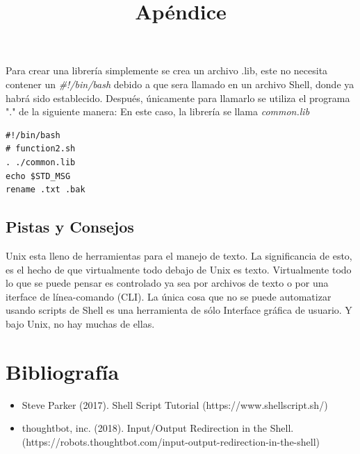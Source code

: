 \documentclass{article}
\begin{document}
Para crear una librería simplemente se crea un archivo .lib, este no necesita contener un \textit{\#!/bin/bash} debido a que sera llamado en un archivo Shell, donde ya habrá sido establecido.
Después, únicamente para llamarlo se utiliza el programa "." de la siguiente manera:
En este caso, la librería se llama \textit{common.lib}

\begin{verbatim}
#!/bin/bash
# function2.sh
. ./common.lib
echo $STD_MSG
rename .txt .bak
\end{verbatim}

\subsection{Pistas y Consejos}

Unix esta lleno de herramientas para el manejo de texto. La significancia de esto, es el hecho de que virtualmente todo debajo de Unix es texto. Virtualmente todo lo que se puede pensar es controlado ya sea por archivos de texto o por una iterface de línea-comando (CLI). La única cosa que no se puede automatizar usando scripts de Shell es una herramienta de sólo Interface gráfica de usuario. Y bajo Unix, no hay muchas de ellas.

\newpage

\section{Bibliografía}
\begin{itemize}
\item Steve Parker (2017). Shell Script Tutorial (https://www.shellscript.sh/)
\item thoughtbot, inc. (2018). Input/Output Redirection in the Shell. (https://robots.thoughtbot.com/input-output-redirection-in-the-shell)
\end{itemize}

\newpage

\title{Apéndice}
\end{document}
